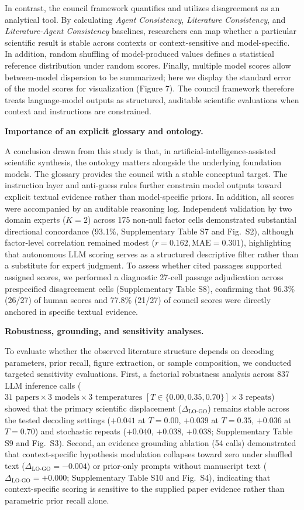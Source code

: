 \documentclass[12pt]{article}
\begin{document}
In contrast, the council framework quantifies and utilizes disagreement as an analytical tool. By calculating \emph{Agent Consistency}, \emph{Literature Consistency}, and \emph{Literature-Agent Consistency} baselines, researchers can map whether a particular scientific result is stable across contexts or context-sensitive and model-specific. In addition, random shuffling of model-produced values defines a statistical reference distribution under random scores. Finally, multiple model scores allow between-model dispersion to be summarized; here we display the standard error of the model scores for visualization (Figure 7). The council framework therefore treats language-model outputs as structured, auditable scientific evaluations when context and instructions are constrained.

\noindent\textbf{Importance of an explicit glossary and ontology.}

A conclusion drawn from this study is that, in artificial-intelligence-assisted scientific synthesis, the ontology matters alongside the underlying foundation models. The glossary provides the council with a stable conceptual target. The instruction layer and anti-guess rules\cite{ref58} further constrain model outputs toward explicit textual evidence rather than model-specific priors. In addition, all scores were accompanied by an auditable reasoning log. Independent validation by two domain experts ($K=2$) across 175 non-null factor cells demonstrated substantial directional concordance (93.1\%, Supplementary Table S7 and Fig.~S2), although factor-level correlation remained modest ($r=0.162, \text{MAE}=0.301$), highlighting that autonomous LLM scoring serves as a structured descriptive filter rather than a substitute for expert judgment. To assess whether cited passages supported assigned scores, we performed a diagnostic 27-cell passage adjudication across prespecified disagreement cells (Supplementary Table S8), confirming that 96.3\% (26/27) of human scores and 77.8\% (21/27) of council scores were directly anchored in specific textual evidence.

\noindent\textbf{Robustness, grounding, and sensitivity analyses.}

To evaluate whether the observed literature structure depends on decoding parameters, prior recall, figure extraction, or sample composition, we conducted targeted sensitivity evaluations. First, a factorial robustness analysis across 837 LLM inference calls ($31\text{ papers} \times 3\text{ models} \times 3\text{ temperatures } [T \in \{0.00, 0.35, 0.70\}] \times 3\text{ repeats}$) showed that the primary scientific displacement ($\Delta_{\text{LO-GO}}$) remains stable across the tested decoding settings ($+0.041$ at $T=0.00$, $+0.039$ at $T=0.35$, $+0.036$ at $T=0.70$) and stochastic repeats ($+0.040$, $+0.038$, $+0.038$; Supplementary Table S9 and Fig.~S3). Second, an evidence grounding ablation (54 calls) demonstrated that context-specific hypothesis modulation collapses toward zero under shuffled text ($\Delta_{\text{LO-GO}} = -0.004$) or prior-only prompts without manuscript text ($\Delta_{\text{LO-GO}} = +0.000$; Supplementary Table S10 and Fig.~S4), indicating that context-specific scoring is sensitive to the supplied paper evidence rather than parametric prior recall alone.
\end{document}
